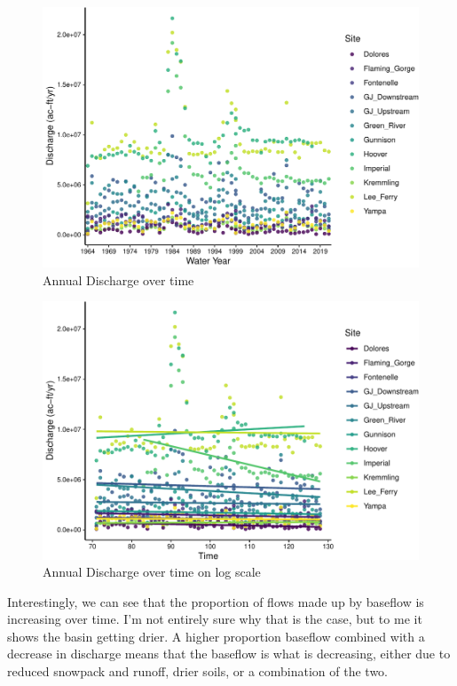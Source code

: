 \documentclass[
  12pt,
]{article}
\begin{document}
\begin{figure}

\includegraphics{WDA_final_project_files/figure-latex/Discharge Over Time-1} \hfill{}

\caption{Annual Discharge over time}\label{fig:Discharge Over Time}
\end{figure}

\begin{figure}

\includegraphics{WDA_final_project_files/figure-latex/Annual Discharge Trends-1} \hfill{}

\caption{Annual Discharge over time on log scale}\label{fig:Annual Discharge Trends}
\end{figure}
\newpage

Interestingly, we can see that the proportion of flows made up by
baseflow is increasing over time. I'm not entirely sure why that is the
case, but to me it shows the basin getting drier. A higher proportion
baseflow combined with a decrease in discharge means that the baseflow
is what is decreasing, either due to reduced snowpack and runoff, drier
soils, or a combination of the two.
\end{document}
